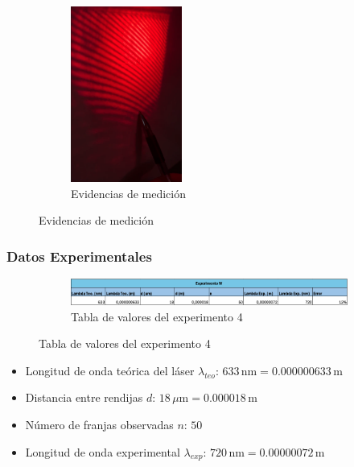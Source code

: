 \begin{figure}[H]
  \centering
  \begin{subfigure}[b]{\textwidth}
      \centering
      \includegraphics[width=0.4\textwidth]{Figures/1. Content/experimento-4.png}
      \caption{Evidencias de medición}
      \label{fig: Evidencias de medicion 4}
  \end{subfigure}
  \hfill
\end{figure}

\subsubsection{Datos Experimentales}

\begin{figure}[H]
  \centering
  \begin{subfigure}[b]{\textwidth}
      \centering
      \includegraphics[width=\textwidth]{Figures/1. Content/tabla-experimento-4.png}
      \caption{Tabla de valores del experimento 4}
      \label{fig: Tabla experimento 4}
  \end{subfigure}
  \hfill
\end{figure}

\begin{itemize}
    \item Longitud de onda teórica del láser \(\lambda_{teo}\): \(633 \, \text{nm} = 0.000000633 \, \text{m}\)
    \item Distancia entre rendijas \(d\): \(18 \, \mu\text{m} = 0.000018 \, \text{m}\)
    \item Número de franjas observadas \(n\): \(50\)
    \item Longitud de onda experimental \(\lambda_{exp}\): \(720 \, \text{nm} = 0.00000072 \, \text{m}\)
\end{itemize}

